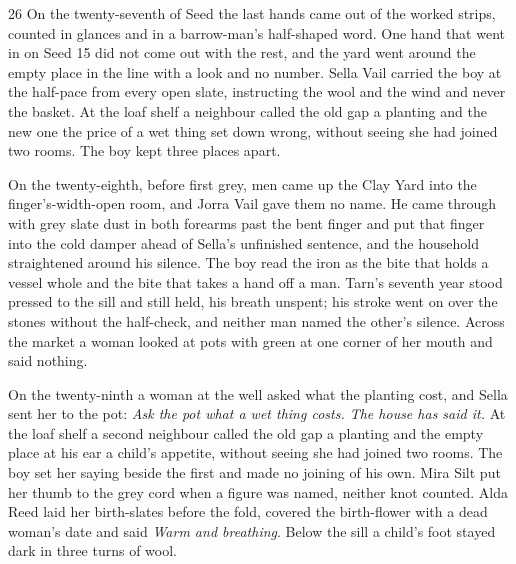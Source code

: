 
\scenebreak


\scenebreak


\scenebreak


\CRtailpiece
\begin{CRchronicle}{26}
On the twenty-seventh of Seed the last hands came out of the worked strips, counted in glances and in a barrow-man’s half-shaped word. One hand that went in on Seed 15 did not come out with the rest, and the yard went around the empty place in the line with a look and no number. Sella Vail carried the boy at the half-pace from every open slate, instructing the wool and the wind and never the basket. At the loaf shelf a neighbour called the old gap a planting and the new one the price of a wet thing set down wrong, without seeing she had joined two rooms. The boy kept three places apart.

On the twenty-eighth, before first grey, men came up the Clay Yard into the finger’s-width-open room, and Jorra Vail gave them no name. He came through with grey slate dust in both forearms past the bent finger and put that finger into the cold damper ahead of Sella’s unfinished sentence, and the household straightened around his silence. The boy read the iron as the bite that holds a vessel whole and the bite that takes a hand off a man. Tarn’s seventh year stood pressed to the sill and still held, his breath unspent; his stroke went on over the stones without the half-check, and neither man named the other’s silence. Across the market a woman looked at pots with green at one corner of her mouth and said nothing.

On the twenty-ninth a woman at the well asked what the planting cost, and Sella sent her to the pot: \emph{Ask the pot what a wet thing costs. The house has said it.} At the loaf shelf a second neighbour called the old gap a planting and the empty place at his ear a child’s appetite, without seeing she had joined two rooms. The boy set her saying beside the first and made no joining of his own. Mira Silt put her thumb to the grey cord when a figure was named, neither knot counted. Alda Reed laid her birth-slates before the fold, covered the birth-flower with a dead woman’s date and said \emph{Warm and breathing}. Below the sill a child’s foot stayed dark in three turns of wool.


\end{CRchronicle}
